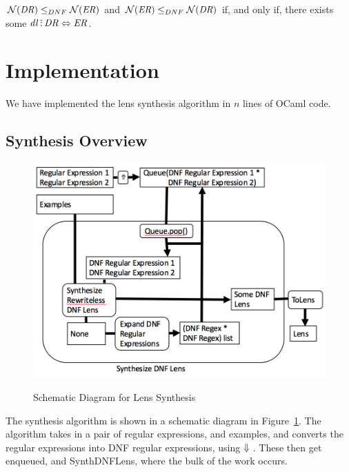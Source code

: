 \documentclass[numbers]{sigplanconf}
\begin{document}
\begin{theorem}
  $\mathcal{N}(\mathit{DR})\leq_{DNF}\mathcal{N}(\mathit{ER})$ and
  $\mathcal{N}(\mathit{ER})\leq_{DNF}\mathcal{N}(\mathit{DR})$
  if, and only
  if, there exists some
  $\mathit{dl} \,\tilde{:}\, \mathit{DR} \Leftrightarrow \mathit{ER}$.
\end{theorem}


\section{Implementation}
We have implemented the lens synthesis algorithm in $n$ lines of OCaml code.

\subsection{Synthesis Overview}
\begin{figure}
  \includegraphics[scale=.5]{synth-lens-schematic.png}
  \label{fig:synth-lens-schematic}
  \caption{Schematic Diagram for Lens Synthesis}
\end{figure}
The synthesis algorithm is shown in a schematic diagram in 
Figure~\ref{fig:synth-lens-schematic}.  The algorithm takes in a pair of
regular expressions, and examples, and converts the regular expressions into
DNF regular expressions, using $\Downarrow{}$.
These then get enqueued, and SynthDNFLens, where the bulk of the work
occurs.
\end{document}
